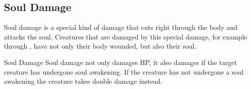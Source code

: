 \subsection{Soul Damage}
\label{sec:Soul Damage}

Soul damage is a special kind of damage that cuts right through the body and
attacks the soul. Creatures that are damaged by this special damage, for
example through , have not only their body wounded,
but also their soul.

\begin{35e}{Soul Damage}
  Soul damage not only damages HP, it also damages  if
  the target creature has undergone soul awakening. If the creature has not
  undergone a soul awakening the creature takes double damage instead.
\end{35e}
